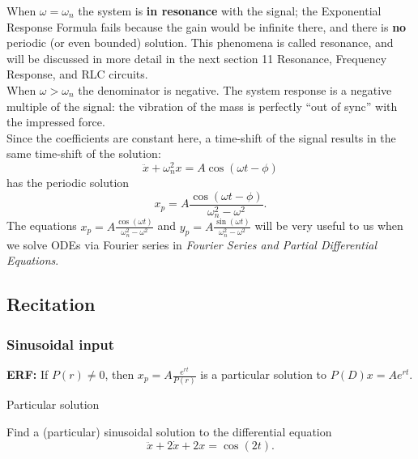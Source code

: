 When $\omega =\omega _ n$ the system is \textbf{in resonance} with the signal;
the Exponential Response Formula fails because the gain would be infinite there,
and there is \textbf{no} periodic (or even bounded) solution.
This phenomena is called resonance, and will be discussed in more detail
in the next section 11 Resonance, Frequency Response, and RLC circuits.\\

When $\omega > \omega _n$ the denominator is negative.
The system response is a negative multiple of the signal:
the vibration of the mass is perfectly ``out of sync'' with the impressed force.\\

Since the coefficients are constant here,
a time-shift of the signal results in the same time-shift of the solution:
\begin{equation*}
  \ddot x+\omega _ n^2x=A\cos (\omega t-\phi )
\end{equation*}
has the periodic solution
\begin{equation*}
  x_ p=A\frac{\cos (\omega t-\phi )}{\omega _ n^2-\omega ^2}.
\end{equation*}
The equations $\displaystyle x_ p=A\frac{\cos (\omega t)}{\omega _ n^2-\omega ^2}$
and $\displaystyle y_ p=A\frac{\sin (\omega t)}{\omega _ n^2-\omega ^2}$
will be very useful to us when we solve ODEs via Fourier series in
\textit{Fourier Series and Partial Differential Equations}. 
\clearpage
\subsection{Recitation}
\clearpage

\subsubsection{Sinusoidal input}
\textbf{ERF: } If $P(r) \neq 0$, then $\displaystyle x_ p = A\frac{e^{rt}}{P(r)}$
is a particular solution to $P(D)x = Ae^{rt}$.

\begin{problem}
  Particular solution
\end{problem}
Find a (particular) sinusoidal solution to the differential equation
\begin{equation*}
  \ddot x+2\dot x+2x=\cos (2t).
\end{equation*}

